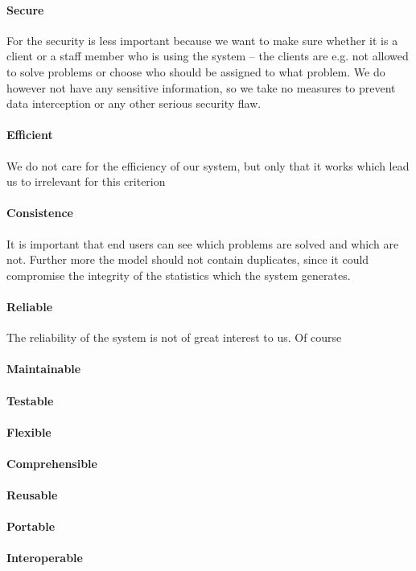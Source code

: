 \paragraph{Secure}
For the \hdesk[] security is less important because we want to make sure whether it is a client or a staff member who is using the system -- the clients are e.g. not allowed to solve problems or choose who should be assigned to what problem.
We do however not have any sensitive information, so we take no measures to prevent data interception or any other serious security flaw.
\paragraph{Efficient}
We do not care for the efficiency of our system, but only that it works which lead us to irrelevant for this criterion 
\paragraph{Consistence}
It is important that end users can see which problems are solved and which are not.
Further more the \hdesk[] model should not contain duplicates, since it could compromise the integrity of the statistics which the system generates. 
\paragraph{Reliable}
The reliability of the \hdesk[] system is not of great interest to us.
Of course 
\paragraph{Maintainable}

\paragraph{Testable}

\paragraph{Flexible} 
\paragraph{Comprehensible} 
\paragraph{Reusable} 
\paragraph{Portable} 
\paragraph{Interoperable}
